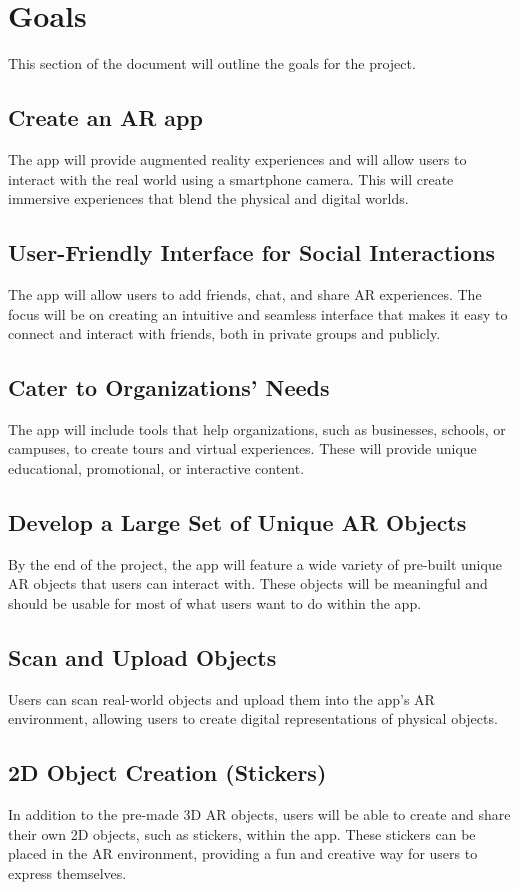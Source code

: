 \documentclass{article}
\begin{document}
\section{Goals}
This section of the document will outline the goals for the project.

\subsection{Create an AR app}
The app will provide augmented reality experiences and will allow users to interact with the real world using a smartphone camera. This will create immersive experiences that blend the physical and digital worlds.

\subsection{User-Friendly Interface for Social Interactions}
The app will allow users to add friends, chat, and share AR experiences. The focus will be on creating an intuitive and seamless interface that makes it easy to connect and interact with friends, both in private groups and publicly.

\subsection{Cater to Organizations’ Needs}
The app will include tools that help organizations, such as businesses, schools, or campuses, to create tours and virtual experiences. These will provide unique educational, promotional, or interactive content.

\subsection{Develop a Large Set of Unique AR Objects}
By the end of the project, the app will feature a wide variety of pre-built unique AR objects that users can interact with. These objects will be meaningful and should be usable for most of what users want to do within the app.

\subsection{Scan and Upload Objects}
Users can scan real-world objects and upload them into the app’s AR environment, allowing users to create digital representations of physical objects.

\subsection{2D Object Creation (Stickers)}
In addition to the pre-made 3D AR objects, users will be able to create and share their own 2D objects, such as stickers, within the app. These stickers can be placed in the AR environment, providing a fun and creative way for users to express themselves.
\end{document}
